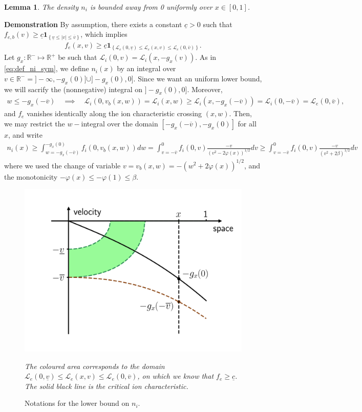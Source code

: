 \documentclass{article}
\newtheorem{lem}{Lemma}[section]
\numberwithin{equation}{section}
\newcommand{\mysubcaption}[1]{
	\vspace*{5pt}
	\begin{minipage}{0.8\linewidth}
		\begin{center}
			\footnotesize\emph{#1}
		\end{center}
	\end{minipage}
}
\newcommand{\myproof}[1]{
	\noindent \textbf{Demonstration}
	{\small	#1 \hfill \qedsymbol}
}
\newcommand{\domfel}{{\underline{v}}} %
\newcommand{\domfeu}{{\overline{v}}} %
\newcommand{\minfe}{{\underline{c}}} %
\begin{document}
\begin{lem}
	The density $n_i$ is bounded away from 0 uniformly over $x\in[0,1]$.
\end{lem}

\myproof{
	By assumption, there exists a constant $\minfe>0$ such that $f_{e,b} (v) \geqslant \minfe \textbf{1}_{\left\{\domfel \leqslant |v| \leqslant \domfeu\right\}}$, which implies
	\begin{align*}
		f_e(x,v) \geqslant \minfe \textbf{1}_{\left\{\mathcal{L}_e(0,\domfel) \leqslant \mathcal{L}_e(x,v) \leqslant \mathcal{L}_e(0,\domfeu)\right\}}.
	\end{align*}
	Let $g_x : \mathbb{R}^{-} \mapsto \mathbb{R}^+$ be such that $\mathcal{L}_i(0,v) = \mathcal{L}_i(x,-g_x(v))$. As in \cref{eq:def_ni_sym}, we define $n_i(x)$ by an integral over $v\in\mathbb{R}^{-} = ]-\infty,-g_x(0)] \cup ]-g_x(0),0]$. Since we want an uniform lower bound, we will sacrify the (nonnegative) integral on $]-g_x(0),0]$. Moreover, 
	\begin{align*}
		w \leqslant -g_x(-\domfeu) \quad\implies\quad \mathcal{L}_i(0,v_b(x,w)) = \mathcal{L}_i(x,w) \geqslant \mathcal{L}_i(x,-g_x(-\domfeu)) = \mathcal{L}_i(0,-\domfeu) = \mathcal{L}_e(0,\domfeu),
	\end{align*}
	and $f_e$ vanishes identically along the ion characteristic crossing $(x,w)$. Then, we may restrict the $w-$integral over the domain $[-g_x(-\domfeu),-g_x(0)]$ for all $x$, and write
	\begin{align*}
		n_i(x) \geqslant \int_{w=-g_x(-\domfeu)}^{-g_x(0)} f_i(0,v_b(x,w)) dw = \int_{v=-\domfeu}^{0} f_i(0,v) \frac{-v}{\left(v^2 - 2 \varphi(x)\right)^{1/2}} dv \geqslant \int_{v=-\domfeu}^{0} f_i(0,v) \frac{-v}{\left(v^2 + 2 \beta\right)^{1/2}} dv
	\end{align*}
	where we used the change of variable $v = v_b(x,w) = -\left(w^2 + 2 \varphi(x)\right)^{1/2}$, and the monotonicity $-\varphi(x) \leqslant -\varphi(1) \leqslant \beta$.
}

\begin{figure}
	\centering
	\includegraphics[width=0.5\linewidth]{images/fpcharmaps_lowerboundni}
	\caption{Notations for the lower bound on $n_i$.}
	\mysubcaption{The coloured area corresponds to the domain $\mathcal{L}_e(0,\domfel) \leqslant \mathcal{L}_e(x,v) \leqslant \mathcal{L}_e(0,\domfeu)$, on which we know that $f_e \geqslant \minfe$. The solid black line is the critical ion characteristic.}
	\label{fig:charmaps_lowerboundni}
\end{figure}
\end{document}
